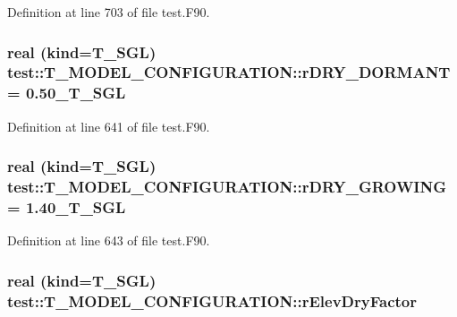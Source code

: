 Definition at line 703 of file test.F90.

\hypertarget{typetest_1_1_t___m_o_d_e_l___c_o_n_f_i_g_u_r_a_t_i_o_n_a98720f353b69a31ab15ab887bc9b860e}{
\subsubsection[{rDRY\_\-DORMANT}]{\setlength{\rightskip}{0pt plus 5cm}real (kind={\bf T\_\-SGL}) {\bf test::T\_\-MODEL\_\-CONFIGURATION::rDRY\_\-DORMANT} = 0.50\_\-T\_\-SGL}}
\label{typetest_1_1_t___m_o_d_e_l___c_o_n_f_i_g_u_r_a_t_i_o_n_a98720f353b69a31ab15ab887bc9b860e}


Definition at line 641 of file test.F90.

\hypertarget{typetest_1_1_t___m_o_d_e_l___c_o_n_f_i_g_u_r_a_t_i_o_n_a9ff5766b4c4b5989bb7f53529b292fbf}{
\subsubsection[{rDRY\_\-GROWING}]{\setlength{\rightskip}{0pt plus 5cm}real (kind={\bf T\_\-SGL}) {\bf test::T\_\-MODEL\_\-CONFIGURATION::rDRY\_\-GROWING} = 1.40\_\-T\_\-SGL}}
\label{typetest_1_1_t___m_o_d_e_l___c_o_n_f_i_g_u_r_a_t_i_o_n_a9ff5766b4c4b5989bb7f53529b292fbf}


Definition at line 643 of file test.F90.

\hypertarget{typetest_1_1_t___m_o_d_e_l___c_o_n_f_i_g_u_r_a_t_i_o_n_ac4068309d8e3265a9a2b57b1788d6f50}{
\subsubsection[{rElevDryFactor}]{\setlength{\rightskip}{0pt plus 5cm}real (kind={\bf T\_\-SGL}) {\bf test::T\_\-MODEL\_\-CONFIGURATION::rElevDryFactor}}}
\label{typetest_1_1_t___m_o_d_e_l___c_o_n_f_i_g_u_r_a_t_i_o_n_ac4068309d8e3265a9a2b57b1788d6f50}


